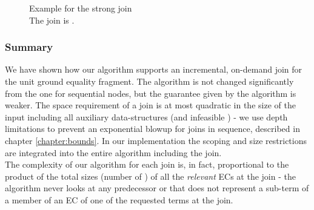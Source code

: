 \begin{figure}

\caption{Example for the strong join\\
The join is .}
\label{EC_strong_join.1a}
\end{figure}


\subsubsection*{Summary}
We have shown how our algorithm supports an incremental, on-demand join for the unit ground equality fragment. 
The algorithm is not changed significantly from the one for sequential nodes, but the guarantee given by the algorithm is weaker.
The space requirement of a join is at most quadratic in the size of the input including all auxiliary data-structures (and infeasible \GTs{}) - we use depth limitations to prevent an exponential blowup for joins in sequence, described in chapter \ref{chapter:bounds}.
In our implementation the scoping and size restrictions are integrated into the entire algorithm including the join.\\
The complexity of our algorithm for each join is, in fact, proportional to the product of the total sizes (number of \GFAs{}) of all the \emph{relevant} ECs at the join - the algorithm never looks at any predecessor \GT{} or \GFA{} that does not represent a sub-term of a member of an EC of one of the requested terms at the join. 
